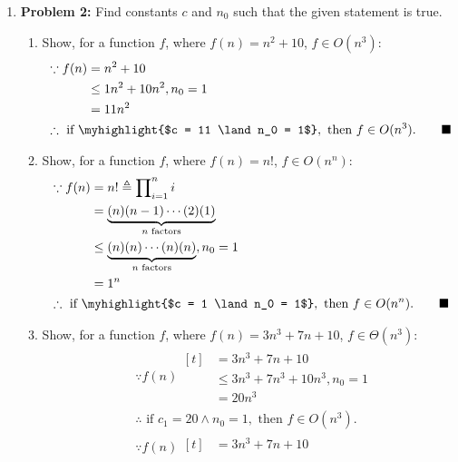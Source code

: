 \documentclass[12pt, a4paper]{article}
\newcommand{\myqed}{\tag*{$\blacksquare$}}
\begin{document}
\begin{enumerate}
	\item \textbf{Problem 2:} Find constants $c$ and $n_0$ such that the given statement is true. \label{2}
		\begin{enumerate}
			\item Show, for a function $f$, where $f(n) = n^2 + 10$, $f \in O(n^3)$:
			\begin{align*}
				& \because f(n)
				\begin{aligned}[t]
					& = n^2 + 10 \\
					& \leq 1n^2 + 10n^2, n_0 = 1 \\
					& = 11n^2
				\end{aligned} \\
				& \therefore \textrm{ if } \myhighlight{$c = 11 \land n_0 = 1$}, \textrm{ then } f \in O(n^3).
				\myqed
			\end{align*} \label{2(a)} %
			\item Show, for a function $f$, where $f(n) = n!$, $f \in O(n^n)$:
			\begin{align*}
				& \because f(n)
				\begin{aligned}[t]
					& = n! \triangleq \prod\nolimits_{i=1}^{n} i \\
					& = \underbrace{(n)(n-1) \cdots(2)(1)}_{n\textrm{ factors}} \\
					& \leq \underbrace{(n)(n)\cdots(n)(n)}_{n\textrm{ factors}}, n_0 = 1 \\
					& = 1^n
				\end{aligned} \\
				& \therefore \textrm{ if } \myhighlight{$c = 1 \land n_0 = 1$}, \textrm{ then } f \in O(n^n).
				\myqed
			\end{align*} \label{2(b)}
			\item Show, for a function $f$, where $f(n) = 3n^3 + 7n + 10$, $f \in \Theta(n^3)$:
			\begin{align*}
				& \because f(n)
				\begin{aligned}[t]
					& = 3n^3 + 7n + 10 \\
					& \leq 3n^3 + 7n^3 + 10n^3, n_0 = 1 \\
					& = 20n^3
				\end{aligned} \\
				& \therefore \textrm{ if } c_1 = 20 \land n_0 = 1, \textrm{ then } f \in O(n^3). \\
				& \because f(n)
				\begin{aligned}[t]
					& = 3n^3 + 7n + 10 \\

\end{aligned}
\end{align*}
\end{enumerate}
\end{enumerate}
\end{document}

